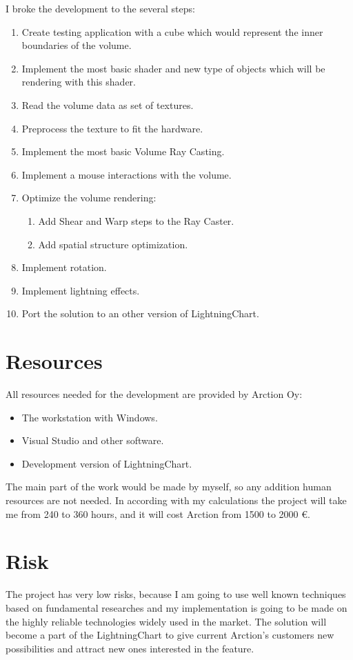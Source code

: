 \documentclass[english]{article}
\begin{document}
I broke the development to the several steps:
\begin{enumerate}
\item Create testing application with a cube which would represent the inner boundaries of the volume. 
\item Implement the most basic shader and new type of objects which will be rendering with this shader.
\item Read the volume data as set of textures.
\item Preprocess the texture to fit the hardware. 
\item Implement the most basic Volume Ray Casting. 
\item Implement a mouse interactions with the volume.
\item Optimize the volume rendering: 
  \begin{enumerate}
    \item Add Shear and Warp steps to the Ray Caster.
    \item Add spatial structure optimization.
  \end{enumerate}
\item Implement rotation.
\item Implement lightning effects. 
\item Port the solution to an other version of LightningChart.
\end{enumerate}

\section{Resources}
All resources needed for the development are provided by Arction Oy:
\begin{itemize}
\item The workstation with Windows.
\item Visual Studio and other software.
\item Development version of LightningChart.
\end{itemize}

The main part of the work would be made by myself, so any addition human resources are not needed.
In according with my calculations the project will take me from 240 to 360 hours, and it will cost Arction from 1500 to 2000 \euro.
\section{Risk}

The project has very low risks, because I am going to use well known techniques based on fundamental researches and my implementation is going to be made on the highly reliable technologies widely used in the market. The solution will become a part of the LightningChart to give current Arction's customers new possibilities and attract new ones interested in the feature.\\
\end{document}
